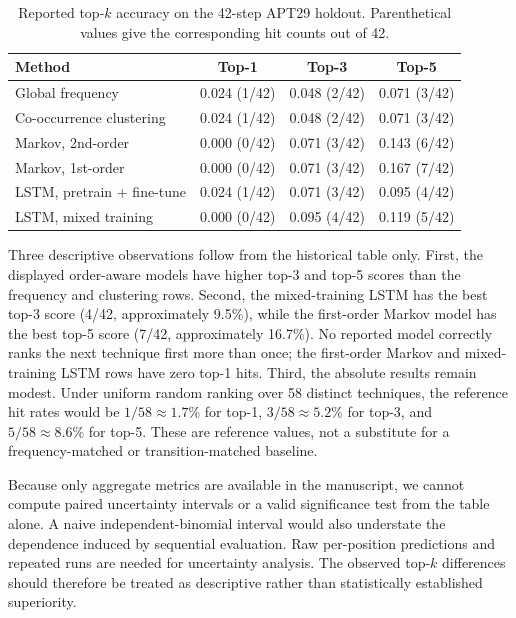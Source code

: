 \documentclass[conference]{IEEEtran}
\begin{document}
\begin{table}[t]
\centering
\caption{Reported top-$k$ accuracy on the 42-step APT29 holdout. Parenthetical values give the corresponding hit counts out of 42.}
\label{tab:results}
\scriptsize
\setlength{\tabcolsep}{3.3pt}
\begin{tabular}{p{}ccc}
\toprule
Method & Top-1 & Top-3 & Top-5\\
\midrule
Global frequency & 0.024 (1/42) & 0.048 (2/42) & 0.071 (3/42)\\
Co-occurrence clustering & 0.024 (1/42) & 0.048 (2/42) & 0.071 (3/42)\\
Markov, 2nd-order & 0.000 (0/42) & 0.071 (3/42) & 0.143 (6/42)\\
Markov, 1st-order & 0.000 (0/42) & 0.071 (3/42) & 0.167 (7/42)\\
LSTM, pretrain + fine-tune & 0.024 (1/42) & 0.071 (3/42) & 0.095 (4/42)\\
LSTM, mixed training & 0.000 (0/42) & 0.095 (4/42) & 0.119 (5/42)\\
\bottomrule
\end{tabular}
\end{table}

Three descriptive observations follow from the historical table only. First, the displayed order-aware models have higher top-3 and top-5 scores than the frequency and clustering rows. Second, the mixed-training LSTM has the best top-3 score (4/42, approximately 9.5\%), while the first-order Markov model has the best top-5 score (7/42, approximately 16.7\%). No reported model correctly ranks the next technique first more than once; the first-order Markov and mixed-training LSTM rows have zero top-1 hits. Third, the absolute results remain modest. Under uniform random ranking over 58 distinct techniques, the reference hit rates would be $1/58\approx1.7\%$ for top-1, $3/58\approx5.2\%$ for top-3, and $5/58\approx8.6\%$ for top-5. These are reference values, not a substitute for a frequency-matched or transition-matched baseline.

Because only aggregate metrics are available in the manuscript, we cannot compute paired uncertainty intervals or a valid significance test from the table alone. A naive independent-binomial interval would also understate the dependence induced by sequential evaluation. Raw per-position predictions and repeated runs are needed for uncertainty analysis. The observed top-$k$ differences should therefore be treated as descriptive rather than statistically established superiority.
\end{document}
